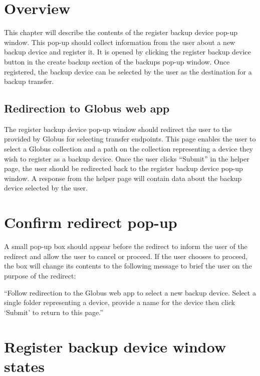 
\section{Overview}

This chapter will describe the contents of the register backup device pop-up 
window. This pop-up should collect information from the user about a new backup device 
and register it. It is opened by clicking the register backup device button in 
the create backup section of the backups pop-up window. Once registered, the 
backup device can be selected by the user as the destination for a backup transfer.

\subsection{Redirection to Globus web app}

The register backup device pop-up window should redirect the user to the 
 provided by Globus for 
selecting transfer endpoints. This page enables the user to select a Globus collection
and a path on the collection representing a device they wish to register as a backup device. 
Once the user clicks ``Submit'' in the helper page, the user should be redirected back to 
the register backup device pop-up window. A response from the helper page will contain 
data about the backup device selected by the user.

\section{Confirm redirect pop-up\label{sec:confirm-redirect-popup}}

A small pop-up box should appear before the redirect to inform the user of the redirect 
and allow the user to cancel or proceed. If the user chooses to proceed, the box will change 
its contents to the following message to brief the user on the purpose of the redirect:

\vspace{3mm}
``Follow redirection to the Globus web app to select a new backup device. Select a single
folder representing a device, provide a name for the device then click `Submit' to return 
to this page.''
\vspace{3mm}

\section{Register backup device window states}

